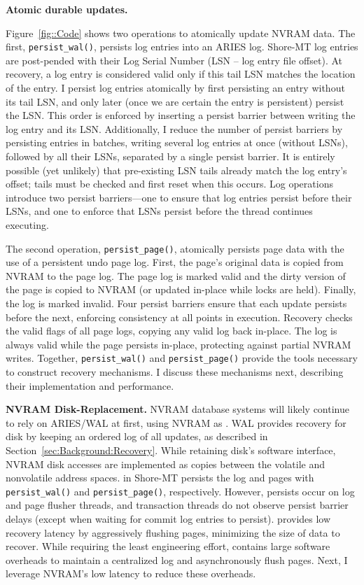 \textbf{Atomic durable updates.}

Figure~\ref{fig::Code} shows two operations to atomically update NVRAM data.
The first, \texttt{persist\_wal()}, persists log entries into an ARIES log.
Sho\-re-MT log entries are post-pended with their Log Serial Number (LSN -- log entry file offset).
At recovery, a log entry is considered valid only if this tail LSN matches the location of the entry.
I persist log entries atomically by first persisting an entry without its tail LSN, and only later (once we are certain the entry is persistent) persist the LSN.
This order is enforced by inserting a persist barrier between writing the log entry and its LSN.
Additionally, I reduce the number of persist barriers by persisting entries in batches, writing several log entries at once (without LSNs), followed by all their LSNs, separated by a single persist barrier.
It is entirely possible (yet unlikely) that pre-existing LSN tails already match the log entry's offset; tails must be checked and first reset when this occurs.
Log operations introduce two persist barriers---one to ensure that log entries persist before their LSNs, and one to enforce that LSNs persist before the thread continues executing.

The second operation, \texttt{persist\_page()}, atomically persists page data with the use of a persistent undo page log.
First, the page's original data is copied from NVRAM to the page log.
The page log is marked valid and the dirty version of the page is copied to NVRAM (or updated in-place while locks are held).
Finally, the log is marked invalid.
Four persist barriers ensure that each update persists before the next, enforcing consistency at all points in execution.
Recovery checks the valid flags of all page logs, copying any valid log back in-place.
The log is always valid while the page persists in-place, protecting against partial NVRAM writes.
Together, \texttt{persist\_wal()} and \texttt{persist\_page()} provide the tools necessary to construct recovery mechanisms.
I discuss these mechanisms next, describing their implementation and performance.

\textbf{NVRAM Disk-Replacement.}
NVRAM database systems will likely continue to rely on ARIES/WAL at first, using NVRAM as \NVDisk.
WAL provides recovery for disk by keeping an ordered log of all updates, as described in Section~\ref{sec:Background:Recovery}.
While retaining disk's software interface, NVRAM disk accesses are implemented as copies between the volatile and nonvolatile address spaces.
\NVDisk in Shore-MT persists the log and pages with \texttt{persist\_wal()} and \texttt{persist\_page()}, respectively.
However, persists occur on log and page flusher threads, and transaction threads do not observe persist barrier delays (except when waiting for commit log entries to persist).
\NVDisk provides low recovery latency by aggressively flushing pages, minimizing the size of data to recover.
While requiring the least engineering effort, \NVDisk contains large software overheads to maintain a centralized log and asynchronously flush pages.
Next, I leverage NVRAM's low latency to reduce these overheads.

